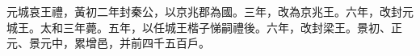 \begin{pinyinscope}
 
 
 元城哀王禮，黃初二年封秦公，以京兆郡為國。三年，改為京兆王。六年，改封元城王。太和三年薨。五年，以任城王楷子悌嗣禮後。六年，改封梁王。景初、正元、景元中，累增邑，并前四千五百戶。
 
 
\end{pinyinscope}